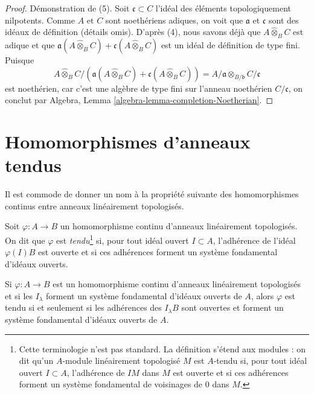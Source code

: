 \begin{proof}
\medskip\noindent
Démonstration de (5).
Soit $\mathfrak c \subset C$ l'idéal des éléments topologiquement nilpotents.
Comme $A$ et $C$ sont noethériens adiques, on voit que
$\mathfrak a$ et $\mathfrak c$ sont des idéaux de définition (détails omis).
D'après (4), nous savons déjà que
$A \widehat{\otimes}_B C$ est adique et que
$\mathfrak a(A \widehat{\otimes}_B C) + \mathfrak c(A \widehat{\otimes}_B C)$
est un idéal de définition de type fini. Puisque
$$
A \widehat{\otimes}_B C /
\left(\mathfrak a(A \widehat{\otimes}_B C) +
\mathfrak c(A \widehat{\otimes}_B C)\right)
=
A/\mathfrak a \otimes_{B/\mathfrak b} C/\mathfrak c
$$
est noethérien, car c'est une algèbre de type fini sur l'anneau noethérien
$C/\mathfrak c$, on conclut par
Algebra, Lemma \ref{algebra-lemma-completion-Noetherian}.
\end{proof}









\section{Homomorphismes d'anneaux tendus}
\label{section-taut-ring-maps}

\noindent
Il est commode de donner un nom à la propriété suivante
des homomorphismes continus entre anneaux linéairement topologisés.

\begin{definition}
\label{definition-taut}
Soit $\varphi : A \to B$ un homomorphisme continu d'anneaux linéairement topologisés.
On dit que $\varphi$ est {\it tendu}\footnote{Cette terminologie n'est pas standard.
La définition s'étend aux modules : on dit qu'un
$A$-module linéairement topologisé $M$ est $A$-tendu si, pour tout idéal ouvert $I \subset A$, l'adhérence
de $IM$ dans $M$ est ouverte et si ces adhérences forment un système fondamental de
voisinages de $0$ dans $M$.}
si, pour tout idéal ouvert $I \subset A$, l'adhérence de l'idéal $\varphi(I)B$
est ouverte et si ces adhérences forment un système fondamental d'idéaux ouverts.
\end{definition}

\noindent
Si $\varphi : A \to B$ est un homomorphisme continu d'anneaux linéairement topologisés
et si les $I_\lambda$ forment un système fondamental d'idéaux ouverts de $A$, alors $\varphi$
est tendu si et seulement si
les adhérences des $I_\lambda B$ sont ouvertes et forment un système fondamental
d'idéaux ouverts de $A$.

